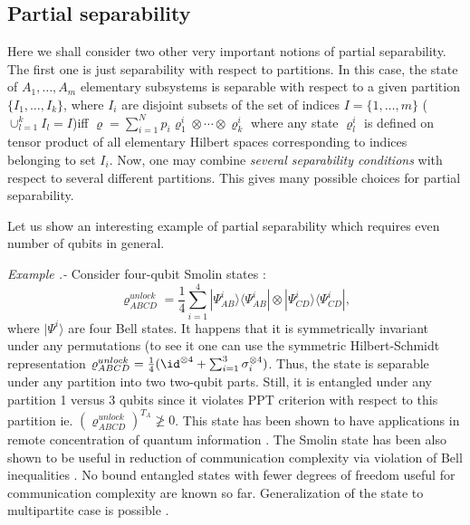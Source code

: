\documentclass[rmp,12pt,preprint]{revtex4-2}
\begin{document}
\subsection{Partial separability \label{subsec:PartialSep}}

Here we shall consider two other very important notions of partial
separability.  The first one is just separability with respect to
partitions.  In this case, the state of $A_{1},\ldots,A_{m}$
elementary subsystems is separable with respect to a given partition
$\{ I_{1}, \ldots, I_{k} \}$, where $I_{i}$ are disjoint subsets of the
set of indices $I=\{ 1, \ldots, m\}$ ($\cup_{l=1}^{k} I_{l} =I$)iff
$\varrho=\sum_{i=1}^{N}p_{i} \varrho^{i}_{1} \otimes \cdots \otimes
\varrho^{i}_{k}$ where any state $\varrho^{i}_{l}$ is defined on
tensor product of all elementary Hilbert spaces corresponding to
indices belonging to set $I_{i}$. Now, one may combine {\it several
  separability conditions} with respect to several different
partitions. This gives many possible choices for partial separability.

Let us show an interesting example of partial separability
which requires even number of qubits in general.

{\it Example .- } Consider four-qubit Smolin states \cite{Smolin}:
\begin{equation}
\varrho^{unlock}_{ABCD}=\frac{1}{4}\sum_{i=1}^{4}
|\Psi^{i}_{AB}\rangle\langle\Psi^{i}_{AB} | \otimes
|\Psi^{i}_{CD}\rangle\langle\Psi^{i}_{CD} |, \label{SmolinS}
\end{equation}
where $|\Psi^{i}\rangle$ are four Bell states. It happens that it is
symmetrically  invariant under any permutations (to see it one can
use the symmetric Hilbert-Schmidt representation
$\varrho^{unlock}_{ABCD}=\frac{1}{4}(\id^{\otimes 4} + \sum_{i=1}^{3}
\sigma^{\otimes 4}_{i})$. Thus, the state is separable under any
partition into two two-qubit parts. Still, it is entangled under any
partition 1 versus 3 qubits since it violates PPT criterion
with respect to this partition ie.
$(\varrho^{unlock}_{ABCD})^{T_{A}}\not\geq 0$. This state has
been shown to have applications in remote concentration of quantum
information \cite{MuraoV1999-concentration}. The Smolin state has
been also shown to be useful in reduction of communication
complexity via violation of Bell inequalities \cite{AugusiakBell}.
No bound entangled states with fewer degrees of freedom
useful for communication complexity are known so far. Generalization
of the state to multipartite case is possible
\cite{LidarWBS,AugusiakGSS}.
\end{document}
